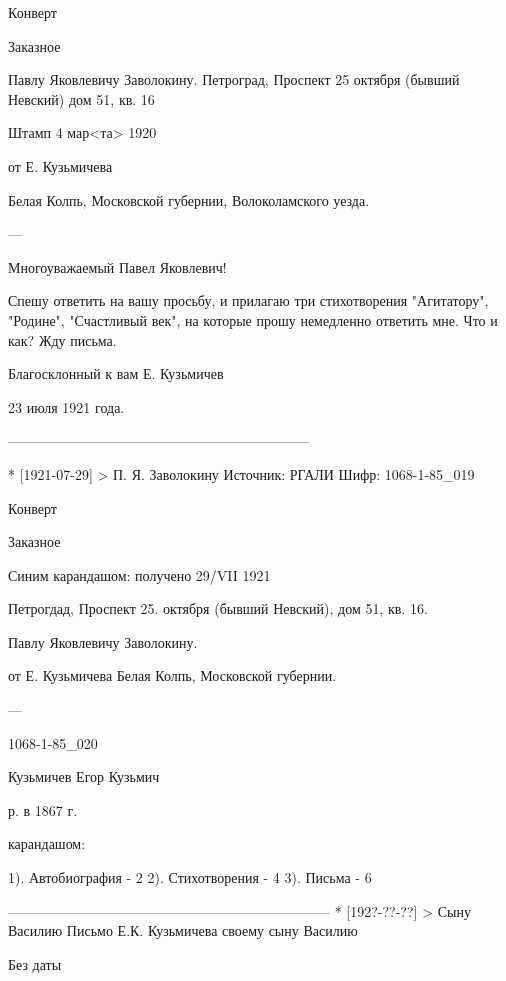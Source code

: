Конверт

Заказное

Павлу Яковлевичу Заволокину.
Петроград, Проспект 25 октября (бывший Невский) дом 51, кв. 16

Штамп 4 мар<та> 1920

от Е. Кузьмичева

Белая Колпь, Московской губернии, Волоколамского уезда.

---

Многоуважаемый Павел Яковлевич!

Спешу ответить на вашу просьбу, и прилагаю три стихотворения "Агитатору", "Родине", "Счастливый век", на которые прошу немедленно ответить мне. Что и как? Жду письма.

Благосклонный к вам Е. Кузьмичев

23 июля 1921 года.

-----------------------------------------------------------------

* [1921-07-29] > П. Я. Заволокину 
Источник: РГАЛИ
Шифр: 1068-1-85_019

Конверт

Заказное

Синим карандашом: получено 29/VII 1921

Петрогдад, Проспект 25. октября (бывший Невский), дом 51, кв. 16.

Павлу Яковлевичу Заволокину.

от Е. Кузьмичева
Белая Колпь, Московской губернии.

---

1068-1-85_020

Кузьмичев Егор Кузьмич

р. в 1867 г.

карандашом: 

1). Автобиография - 2
2). Стихотворения - 4
3). Письма - 6 




---------------------------------------------------------------------
* [192?-??-??] > Сыну Василию
Письмо Е.К. Кузьмичева своему сыну Василию

Без даты

